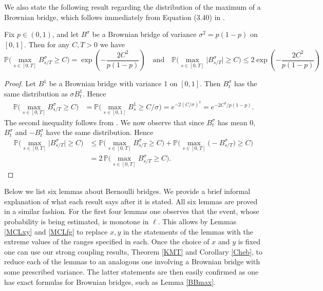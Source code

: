We also state the following result regarding the distribution of the maximum of a Brownian bridge, which follows immediately from Equation (3.40) in \cite[Chapter 4]{KS}.

\begin{lemma}\label{BBmax}
	Fix $p\in (0,1)$, and let $B^\sigma$ be a Brownian bridge of variance $\sigma^2 = p(1-p)$ on $[0,1]$. Then for any $C,T> 0$ we have
	\[
	\mathbb{P}\Big(\max_{s\in[0,T]} B^\sigma_{s/T} \geq C\Big) = \exp\left( - \frac{2C^2}{p(1-p)}\right) \quad \mathrm{and} \quad \mathbb{P}\Big(\max_{s\in[0,T]} \big|B^\sigma_{s/T}\big| \geq C\Big) \leq 2\exp\left( - \frac{2C^2}{p(1-p)}\right)
	\]
\end{lemma}

\begin{proof}
	Let $B^1$ be a Brownian bridge with variance 1 on $[0,1]$. Then $B^\sigma_t$ has the same distribution as $\sigma B^1_t$. Hence
	\begin{align*}
	\mathbb{P}\Big( \max_{s\in[0,T]} B^\sigma_{s/T} \geq C \Big) &= \mathbb{P}\Big( \max_{s\in[0,1]} B^1_s \geq C/\sigma \Big) = e^{-2(C/\sigma)^2} = e^{-2C^2/p(1-p)}.
	\end{align*}
	The second inequality follows from \cite[Chapter 4, (3.40)]{KS}. We now observe that since $B^\sigma_t$ has mean 0, $B^\sigma_t$ and $-B^\sigma_t$ have the same distribution. Hence
	\begin{align*}
	\mathbb{P}\Big( \max_{s\in[0,T]} \big| B^\sigma_{s/T}\big| \geq C \Big) &\leq \mathbb{P}\Big( \max_{s\in[0,T]}  B^\sigma_{s/T} \geq C \Big) + \mathbb{P}\Big( \max_{s\in[0,T]}  \big(-B^\sigma_{s/T}\big) \geq C \Big)\\
	&= 2\,\mathbb{P}\Big( \max_{s\in[0,T]}  B^\sigma_{s/T} \geq C \Big).
	\end{align*}
\end{proof}

Below we list six lemmas about Bernoulli bridges. We provide a brief informal explanation of what each result says after it is stated. All six lemmas are proved in a similar fashion. For the first four lemmas one observes that the event, whose probability is being estimated, is monotone in $\ell$. This allows by Lemmas \ref{MCLxy} and \ref{MCLfg} to replace $x,y$ in the statements of the lemmas with the extreme values of the ranges specified in each. Once the choice of $x$ and $y$ is fixed one can use our strong coupling results, Theorem \ref{KMT} and Corollary \ref{Cheb}, to reduce each of the lemmas to an analogous one involving a Brownian bridge with some prescribed variance. The latter statements are then easily confirmed as one has exact formulas for Brownian bridges, such as Lemma \ref{BBmax}.\\

